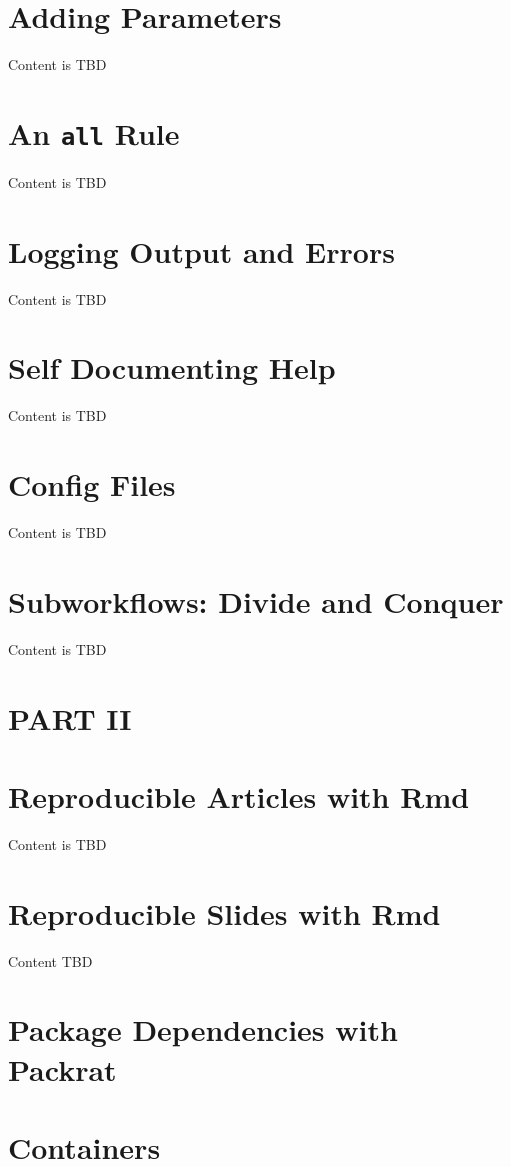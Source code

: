 \documentclass[]{book}
\theoremstyle{definition}
\theoremstyle{definition}
\theoremstyle{definition}
\theoremstyle{remark}
\begin{document}
\chapter{Adding Parameters}\label{adding-parameters}

Content is TBD

\chapter{\texorpdfstring{An \texttt{all}
Rule}{An all Rule}}\label{an-all-rule}

Content is TBD

\chapter{Logging Output and Errors}\label{logging-output-and-errors}

Content is TBD

\chapter{Self Documenting Help}\label{self-documenting-help}

Content is TBD

\chapter{Config Files}\label{config-files}

Content is TBD

\chapter{Subworkflows: Divide and
Conquer}\label{subworkflows-divide-and-conquer}

Content is TBD

\chapter*{PART II}\label{part-ii}

\chapter{Reproducible Articles with
Rmd}\label{reproducible-articles-with-rmd}

Content is TBD

\chapter{Reproducible Slides with
Rmd}\label{reproducible-slides-with-rmd}

Content TBD

\chapter{Package Dependencies with
Packrat}\label{package-dependencies-with-packrat}

\chapter{Containers}\label{containers}


\end{document}
